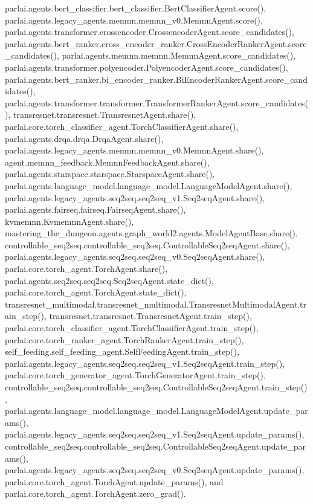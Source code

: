 parlai.\+agents.\+bert\+\_\+classifier.\+bert\+\_\+classifier.\+Bert\+Classifier\+Agent.\+score(), parlai.\+agents.\+legacy\+\_\+agents.\+memnn.\+memnn\+\_\+v0.\+Memnn\+Agent.\+score(), parlai.\+agents.\+transformer.\+crossencoder.\+Crossencoder\+Agent.\+score\+\_\+candidates(), parlai.\+agents.\+bert\+\_\+ranker.\+cross\+\_\+encoder\+\_\+ranker.\+Cross\+Encoder\+Ranker\+Agent.\+score\+\_\+candidates(), parlai.\+agents.\+memnn.\+memnn.\+Memnn\+Agent.\+score\+\_\+candidates(), parlai.\+agents.\+transformer.\+polyencoder.\+Polyencoder\+Agent.\+score\+\_\+candidates(), parlai.\+agents.\+bert\+\_\+ranker.\+bi\+\_\+encoder\+\_\+ranker.\+Bi\+Encoder\+Ranker\+Agent.\+score\+\_\+candidates(), parlai.\+agents.\+transformer.\+transformer.\+Transformer\+Ranker\+Agent.\+score\+\_\+candidates(), transresnet.\+transresnet.\+Transresnet\+Agent.\+share(), parlai.\+core.\+torch\+\_\+classifier\+\_\+agent.\+Torch\+Classifier\+Agent.\+share(), parlai.\+agents.\+drqa.\+drqa.\+Drqa\+Agent.\+share(), parlai.\+agents.\+legacy\+\_\+agents.\+memnn.\+memnn\+\_\+v0.\+Memnn\+Agent.\+share(), agent.\+memnn\+\_\+feedback.\+Memnn\+Feedback\+Agent.\+share(), parlai.\+agents.\+starspace.\+starspace.\+Starspace\+Agent.\+share(), parlai.\+agents.\+language\+\_\+model.\+language\+\_\+model.\+Language\+Model\+Agent.\+share(), parlai.\+agents.\+legacy\+\_\+agents.\+seq2seq.\+seq2seq\+\_\+v1.\+Seq2seq\+Agent.\+share(), parlai.\+agents.\+fairseq.\+fairseq.\+Fairseq\+Agent.\+share(), kvmemnn.\+Kvmemnn\+Agent.\+share(), mastering\+\_\+the\+\_\+dungeon.\+agents.\+graph\+\_\+world2.\+agents.\+Model\+Agent\+Base.\+share(), controllable\+\_\+seq2seq.\+controllable\+\_\+seq2seq.\+Controllable\+Seq2seq\+Agent.\+share(), parlai.\+agents.\+legacy\+\_\+agents.\+seq2seq.\+seq2seq\+\_\+v0.\+Seq2seq\+Agent.\+share(), parlai.\+core.\+torch\+\_\+agent.\+Torch\+Agent.\+share(), parlai.\+agents.\+seq2seq.\+seq2seq.\+Seq2seq\+Agent.\+state\+\_\+dict(), parlai.\+core.\+torch\+\_\+agent.\+Torch\+Agent.\+state\+\_\+dict(), transresnet\+\_\+multimodal.\+transresnet\+\_\+multimodal.\+Transresnet\+Multimodal\+Agent.\+train\+\_\+step(), transresnet.\+transresnet.\+Transresnet\+Agent.\+train\+\_\+step(), parlai.\+core.\+torch\+\_\+classifier\+\_\+agent.\+Torch\+Classifier\+Agent.\+train\+\_\+step(), parlai.\+core.\+torch\+\_\+ranker\+\_\+agent.\+Torch\+Ranker\+Agent.\+train\+\_\+step(), self\+\_\+feeding.\+self\+\_\+feeding\+\_\+agent.\+Self\+Feeding\+Agent.\+train\+\_\+step(), parlai.\+agents.\+legacy\+\_\+agents.\+seq2seq.\+seq2seq\+\_\+v1.\+Seq2seq\+Agent.\+train\+\_\+step(), parlai.\+core.\+torch\+\_\+generator\+\_\+agent.\+Torch\+Generator\+Agent.\+train\+\_\+step(), controllable\+\_\+seq2seq.\+controllable\+\_\+seq2seq.\+Controllable\+Seq2seq\+Agent.\+train\+\_\+step(), parlai.\+agents.\+language\+\_\+model.\+language\+\_\+model.\+Language\+Model\+Agent.\+update\+\_\+params(), parlai.\+agents.\+legacy\+\_\+agents.\+seq2seq.\+seq2seq\+\_\+v1.\+Seq2seq\+Agent.\+update\+\_\+params(), controllable\+\_\+seq2seq.\+controllable\+\_\+seq2seq.\+Controllable\+Seq2seq\+Agent.\+update\+\_\+params(), parlai.\+agents.\+legacy\+\_\+agents.\+seq2seq.\+seq2seq\+\_\+v0.\+Seq2seq\+Agent.\+update\+\_\+params(), parlai.\+core.\+torch\+\_\+agent.\+Torch\+Agent.\+update\+\_\+params(), and parlai.\+core.\+torch\+\_\+agent.\+Torch\+Agent.\+zero\+\_\+grad().

